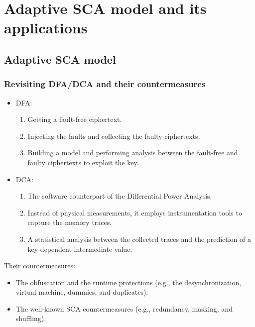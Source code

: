 \documentclass{beamer}
\begin{document}
\section{Adaptive SCA model and its applications}
\subsection{Adaptive SCA model}


\frame
{
	\frametitle{Revisiting DFA/DCA and their countermeasures}
	\begin{itemize}
		\item DFA:
        \begin{enumerate}
        \item Getting a fault-free ciphertext.
	    \item Injecting the faults and collecting the faulty ciphertexts.
	    \item Building a model and performing analysis between the fault-free and faulty ciphertexts to exploit the key.
        \end{enumerate}
        \item DCA:
        \begin{enumerate}
	    \item The software counterpart of the Differential Power Analysis. 
	    \item Instead of physical measurements, it employs instrumentation tools to capture the memory traces.
	    \item A statistical analysis between the collected traces and the prediction of a key-dependent intermediate value.
        \end{enumerate}
    \end{itemize}

    Their countermeasures:   
	\begin{itemize}
		\item The obfuscation and the runtime protections (e.g., the desynchronization, virtual machine, dummies, and duplicates).
		\item The well-known SCA countermeasures (e.g., redundancy, masking, and shuffling).
	\end{itemize}
}
\end{document}
